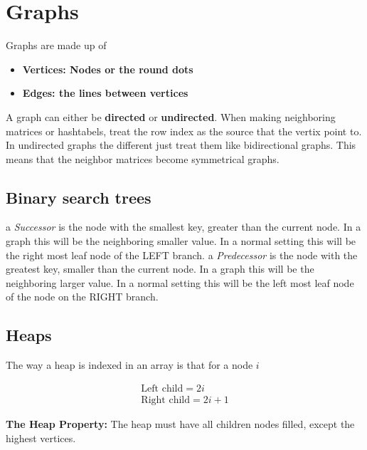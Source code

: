 \section{Graphs}

Graphs are made up of 
\begin{itemize}
    \item \bf{Vertices:} Nodes or the round dots
    \item \bf{Edges:} the lines between vertices
\end{itemize}

A graph can either be \textbf{directed} or \textbf{undirected}. When making neighboring matrices or hashtabels, treat the row index as the source that the vertix point to. In undirected graphs the different just treat them like bidirectional graphs. This means that the neighbor matrices become symmetrical graphs. 

\subsection{Binary search trees}

a \emph{Successor} is the node with the smallest key, greater than the current node.
In a graph this will be the neighboring smaller value. In a normal setting this will be the right most leaf node of the LEFT branch. 
a \emph{Predecessor} is the node with the greatest key, smaller than the current node.
In a graph this will be the neighboring larger value. 
In a normal setting this will be the left most leaf node of the node on the RIGHT branch. 

\subsection{Heaps}

The way a heap is indexed in an array is that for a node $i$

\begin{align}
    \text{Left child} = 2i \\
    \text{Right child} = 2i+1
\end{align}

\textbf{The Heap Property:} The heap must have all children nodes filled, except the highest vertices. 